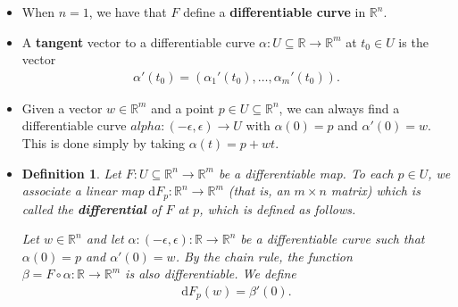 \documentclass[10pt]{article}
\newtheorem{definition}[lemma]{Definition}
\newcommand{\dee}{\mathrm{d}}
\newcommand{\ra}{\rightarrow}
\newcommand{\Real}{\mathbb{R}}
\newcommand{\sseq}{\subseteq}
\begin{document}
\begin{itemize}
    \item When $n = 1$, we have that $F$ define a {\bf differentiable curve} in $\Real^n$.

    \item A {\bf tangent} vector to a differentiable curve $\alpha: U \sseq \Real \ra \Real^m$ at $t_0 \in U$ is the vector
    \begin{align*}
      \alpha'(t_0) = (\alpha_1'(t_0), \dotsc, \alpha_m'(t_0)).
    \end{align*}

    \item Given a vector $w \in \Real^m$ and a point $p \in U \sseq \Real^n$, we can always find a differentiable curve $alpha : (-\epsilon, \epsilon) \ra U$ with $\alpha(0) = p$ and $\alpha'(0) = w$. This is done simply by taking $\alpha(t) = p + wt$.

    \item \begin{definition}
      Let $F: U \sseq \Real^n \ra \Real^m$ be a differentiable map. To each $p \in U$, we associate a linear map 
      $\dee F_p: \Real^n \ra \Real^m$ (that is, an $m \times n$ matrix) which is called the {\bf differential} of $F$ at $p$, which is defined as follows.

      Let $w \in \Real^n$ and let $\alpha : (-\epsilon, \epsilon): \Real \ra \Real^n$ be a differentiable curve such that $\alpha(0) = p$ and $\alpha'(0) = w$. By the chain rule, the function $\beta = F \circ \alpha : \Real \ra \Real^m$ is also differentiable. We define
      \begin{align*}
        \dee F_p(w) = \beta'(0).
      \end{align*}
    \end{definition}


\end{itemize}
\end{document}
